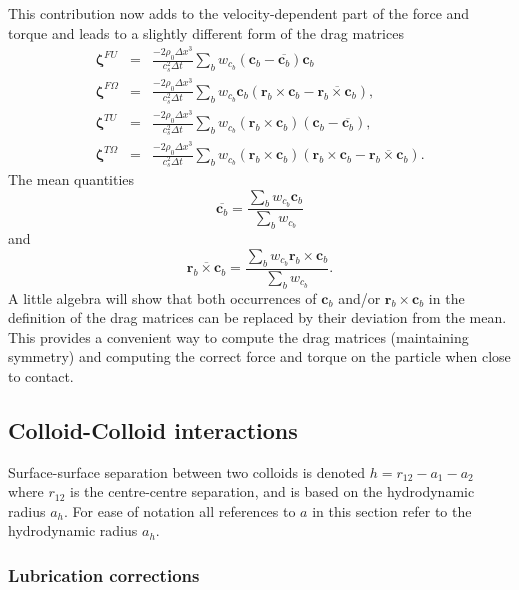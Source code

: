This contribution
now adds to the velocity-dependent part of the force and torque and
leads to a slightly different form of the drag matrices
\begin{eqnarray}
\boldsymbol{\zeta}^{FU} &=& \frac{-2\rho_0 \Delta x^3}{c_s^2 \Delta t}
\sum_b w_{c_b} (\mathbf{c}_b - \overline{\mathbf{c}_b}) \mathbf{c}_b
\\
\boldsymbol{\zeta}^{F\Omega} &=& \frac{-2\rho_0 \Delta x^3}{c_s^2 \Delta t}
\sum_b w_{c_b} \mathbf{c}_b (\mathbf{r}_b \times \mathbf{c}_b -
\overline{\mathbf{r}_b\times\mathbf{c}_b}),
\\
\boldsymbol{\zeta}^{TU} &=& \frac{-2\rho_0 \Delta x^3}{c_s^2 \Delta t}
\sum_b w_{c_b} (\mathbf{r}_b\times\mathbf{c}_b)
(\mathbf{c}_b - \overline{\mathbf{c}_b}),
\\
\boldsymbol{\zeta}^{T\Omega} &=& \frac{-2\rho_0 \Delta x^3}{c_s^2 \Delta t}
\sum_b w_{c_b} (\mathbf{r}_b\times\mathbf{c}_b)
(\mathbf{r}_b\times\mathbf{c}_b - \overline{\mathbf{r}_b\times\mathbf{c}_b}).
\end{eqnarray}
The mean quantities
\begin{equation}
\overline{\mathbf{c}_b} = \frac{\sum_b w_{c_b} \mathbf{c}_b}{ \sum_b w_{c_b}}
\end{equation}
and
\begin{equation}
\overline{\mathbf{r}_b\times\mathbf{c}_b} =
\frac{\sum_b w_{c_b} \mathbf{r}_b\times\mathbf{c}_b}{\sum_b w_{c_b}}.
\end{equation}
A little algebra will show that both occurrences of $\mathbf{c}_b$ and/or
$\mathbf{r}_b\times\mathbf{c}_b$ in the definition of the drag matrices
can be replaced by their deviation from the mean. This provides a
convenient way to compute the drag matrices (maintaining symmetry)
and computing the correct force and torque on the particle when close
to contact.


\subsection{Colloid-Colloid interactions}

Surface-surface separation between two colloids is denoted
$h = r_{12} - a_1 - a_2$ where $r_{12}$ is the centre-centre
separation, and is based on the hydrodynamic radius $a_h$.
For ease of notation all references to $a$ in this section refer to
the hydrodynamic radius $a_h$.


\subsubsection{Lubrication corrections}

